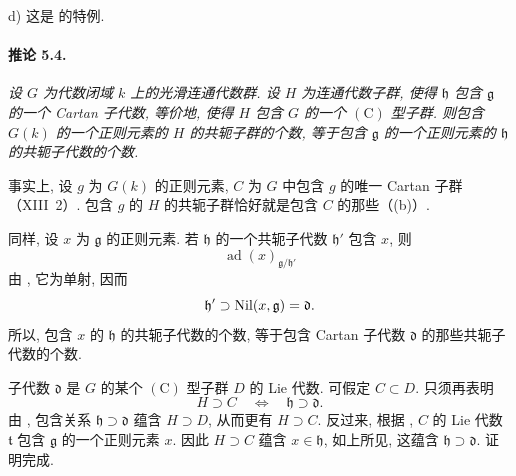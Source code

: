 \smallskip
\noindent
\textup{d)}
这是 \textup{} 的特例.



\paragraph{\textbf{推论 5.4.}}
{\itshape 设 \(G\) 为代数闭域 \(k\) 上的光滑连通代数群. 设 \(H\) 为连通代数子群, 使得 \(\mathfrak h\) 包含 \(\mathfrak g\) 的一个 Cartan 子代数, 等价地, 使得 \(H\) 包含 \(G\) 的一个 \((\mathrm C)\) 型子群. 则包含 \(G(k)\) 的一个正则元素的 \(H\) 的共轭子群的个数, 等于包含 \(\mathfrak g\) 的一个正则元素的 \(\mathfrak h\) 的共轭子代数的个数.}

事实上, 设 \(g\) 为 \(G(k)\) 的正则元素, \(C\) 为 \(G\) 中包含 \(g\) 的唯一 Cartan 子群\textup{（XIII~2）}. 包含 \(g\) 的 \(H\) 的共轭子群恰好就是包含 \(C\) 的那些\textup{（\textup{(b)}）}.

同样, 设 \(x\) 为 \(\mathfrak g\) 的正则元素. 若 \(\mathfrak h\) 的一个共轭子代数 \(\mathfrak h'\) 包含 \(x\), 则
\[
  \operatorname{ad}(x)_{\mathfrak g/\mathfrak h'}
\]
由 , 它为单射, 因而
\[
  \mathfrak h'\supset\operatorname{Nil}(x,\mathfrak g)=\mathfrak d.
\]
所以, 包含 \(x\) 的 \(\mathfrak h\) 的共轭子代数的个数, 等于包含 Cartan 子代数 \(\mathfrak d\) 的那些共轭子代数的个数.

子代数 \(\mathfrak d\) 是 \(G\) 的某个 \((\mathrm C)\) 型子群 \(D\) 的 Lie 代数. 可假定 \(C\subset D\). 只须再表明
\[
  H\supset C\quad\Longleftrightarrow\quad
  \mathfrak h\supset\mathfrak d.
\]
由 , 包含关系 \(\mathfrak h\supset\mathfrak d\) 蕴含 \(H\supset D\), 从而更有 \(H\supset C\). 反过来, 根据 , \(C\) 的 Lie 代数 \(\mathfrak t\) 包含 \(\mathfrak g\) 的一个正则元素 \(x\). 因此 \(H\supset C\) 蕴含 \(x\in\mathfrak h\), 如上所见, 这蕴含 \(\mathfrak h\supset\mathfrak d\). 证明完成.

